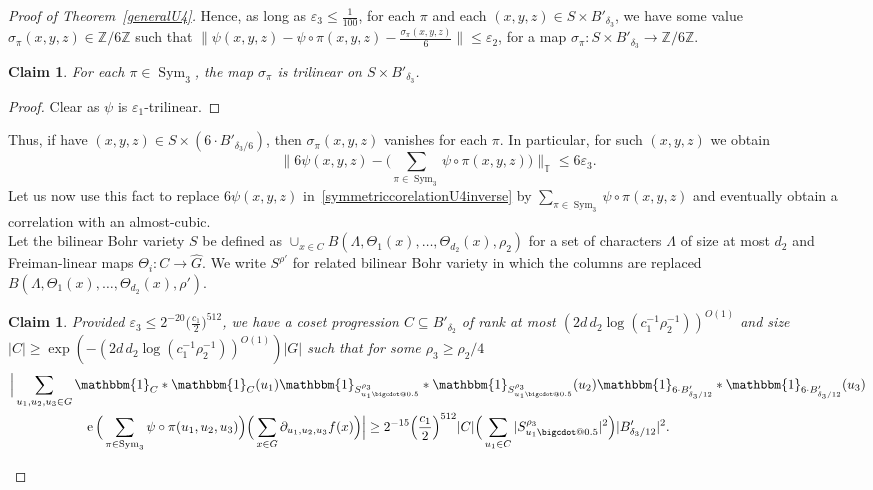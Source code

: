 \documentclass[a4paper,11pt]{article}
\makeatletter
\numberwithin{theorem}{section}
\newtheorem{claim}[theorem]{Claim}
\theoremstyle{definition}
\newcommand\id{\mathbbm{1}}
\newcommand{\on}[1]{
	\operatorname{#1}
}
\newcommand*\bcdot{\mathpalette\bigcdot@{0.5}}
\newcommand*\bigcdot@[2]{\mathbin{\vcenter{\hbox{\scalebox{#2}{$\m@th#1\bullet$}}}}}
\makeatother
\begin{document}
\begin{proof}[Proof of Theorem~\ref{generalU4}]
    Hence, as long as $\varepsilon_3 \leq \frac{1}{100}$, for each $\pi$ and each $(x,y,z) \in S \times B'_{\delta_3}$, we have some value $\sigma_\pi(x,y,z) \in \mathbb{Z}/6\mathbb{Z}$ such that $\Big\|\psi(x,y,z) - \psi \circ \pi(x,y,z) - \frac{\sigma_\pi(x,y,z)}{6}\Big\|\leq \varepsilon_2$, for a map $\sigma_\pi : S \times B'_{\delta_3} \to \mathbb{Z}/6\mathbb{Z}$.\\

    \begin{claim}
        For each $\pi \in \on{Sym}_3$, the map $\sigma_\pi$ is trilinear on $S \times B'_{\delta_3}$.
    \end{claim}

    \begin{proof}
        Clear as $\psi$ is $\varepsilon_1$-trilinear.
    \end{proof}

    Thus, if have $(x,y,z) \in S \times (6 \cdot B'_{\delta_3/6})$, then $\sigma_\pi(x,y,z)$ vanishes for each $\pi$. In particular, for such $(x,y,z)$ we obtain
    \begin{equation}\Big\|6\psi(x,y,z) - \Big(\sum_{\pi \in \on{Sym}_3}\psi \circ \pi(x,y,z)\Big)\Big\|_{\mathbb{T}} \leq 6\varepsilon_3.\label{sixpsitopermpsi}\end{equation}
    Let us now use this fact to replace $6\psi(x,y,z)$ in~\eqref{symmetriccorelationU4inverse} by $\sum_{\pi \in \on{Sym}_3}\psi \circ \pi(x,y,z)$ and eventually obtain a correlation with an almost-cubic. \\

    Let the bilinear Bohr variety $S$ be defined as $\cup_{x \in C} B(\Lambda, \Theta_1(x), \dots, \Theta_{d_2}(x), \rho_2)$ for a set of characters $\Lambda$ of size at most $d_2$ and Freiman-linear maps $\Theta_i : C \to \hat{G}$. We write $S^{\rho'}$ for related bilinear Bohr variety in which the columns are replaced $B(\Lambda, \Theta_1(x), \dots, \Theta_{d_2}(x), \rho')$.

    \begin{claim}
        Provided $\varepsilon_3 \leq 2^{-20}\Big(\frac{c_1}{2}\Big)^{512}$, we have a coset progression $C \subseteq B'_{\delta_2}$ of  rank at most $(2d\,d_2\log(c_1^{-1}\rho_2^{-1}))^{O(1)}$ and size $|C| \geq \exp(-(2d\,d_2\log(c_1^{-1}\rho_2^{-1}))^{O(1)})|G|$ such that for some $\rho_3 \geq \rho_2/4$
        \begin{align*}&\Big|\sum_{u_1, u_2, u_3 \in G} \id_{C} \ast \id_{C}(u_1)\id_{S^{\rho_3}_{u_1 \bcdot}} \ast \id_{S^{\rho_3}_{u_1 \bcdot}}(u_2)\id_{6 \cdot B'_{\delta_3/{12}}} \ast \id_{6 \cdot B'_{\delta_3/12}}(u_3)\\
        &\hspace{2cm}\on{e}\Big(\sum_{\pi \in \on{Sym}_3}\psi\circ\pi(u_1, u_2, u_3)\Big) \Big(\sum_{x \in G} \partial_{u_1, u_2, u_3} f(x)\Big) \Big| \geq 2^{-15}\Big(\frac{c_1}{2}\Big)^{512}  |C| \Big(\sum_{u_1 \in C} |S^{\rho_3}_{u_1 \bcdot}|^2\Big)  |B'_{\delta_3/12}|^2.
        \end{align*}
    \end{claim}


\end{proof}
\end{document}
